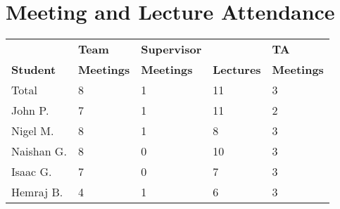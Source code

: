 \documentclass{article}
\begin{document}
\newpage
\section{Meeting and Lecture Attendance}





\begin{table}[H]
\centering
\begin{tabular}{lllll}
\toprule
\textbf{ } & \textbf{Team} & \textbf{Supervisor} & \textbf{ } & \textbf{TA}\\
\textbf{Student} & \textbf{Meetings} & \textbf{Meetings} & \textbf{Lectures} & \textbf{Meetings}\\
\midrule
Total & 8 & 1 & 11 & 3\\
\midrule
John P. & 7 & 1 & 11 & 2\\
Nigel M. & 8 & 1 & 8 & 3\\
Naishan G. & 8 & 0 & 10 & 3\\
Isaac G. & 7 & 0 & 7 & 3\\
Hemraj B. & 4 & 1 & 6 & 3\\
\bottomrule
\end{tabular}
\end{table}

\end{document}
